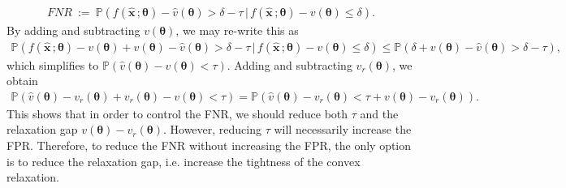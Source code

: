\documentclass[10pt]{article} %
\theoremstyle{plain}
\theoremstyle{definition}
\theoremstyle{remark}
\begin{document}
\begin{align*}
    \mathit{FNR} ~:=~ \mathbb{P}(f(\hat{\mathbf{x}}\, ; \bm{\theta}) - \hat{v}(\bm{\theta}) > \delta - \tau \,|\, f(\hat{\mathbf{x}}\, ; \bm{\theta}) - v(\bm{\theta}) \leq \delta).
\end{align*}
By adding and subtracting $v(\bm{\theta})$, we may re-write this as
\begin{align*}
    \mathbb{P}(f(\hat{\mathbf{x}}\, ; \bm{\theta}) - v(\bm{\theta}) + v(\bm{\theta}) - \hat{v}(\bm{\theta}) > \delta - \tau \,|\, f(\hat{\mathbf{x}}\, ; \bm{\theta}) - v(\bm{\theta}) \leq \delta)
    \leq \mathbb{P}(\delta + v(\bm{\theta}) - \hat{v}(\bm{\theta}) > \delta - \tau),
\end{align*}
which simplifies to $\mathbb{P}(\hat{v}(\bm{\theta}) - v(\bm{\theta}) < \tau)$. Adding and subtracting $v_r(\bm{\theta})$, we obtain
\begin{align*}
    \mathbb{P}(\hat{v}(\bm{\theta}) - v_r(\bm{\theta}) + v_r(\bm{\theta}) - v(\bm{\theta}) < \tau) = \mathbb{P}(\hat{v}(\bm{\theta}) - v_r(\bm{\theta}) < \tau + v(\bm{\theta}) - v_r(\bm{\theta})).
\end{align*}
This shows that in order to control the FNR, we should reduce both $\tau$ and the relaxation gap $v(\bm{\theta}) - v_r(\bm{\theta})$. However, reducing $\tau$ will necessarily increase the FPR. Therefore, to reduce the FNR without increasing the FPR, the only option is to reduce the relaxation gap, i.e. increase the tightness of the convex relaxation.



\end{document}
